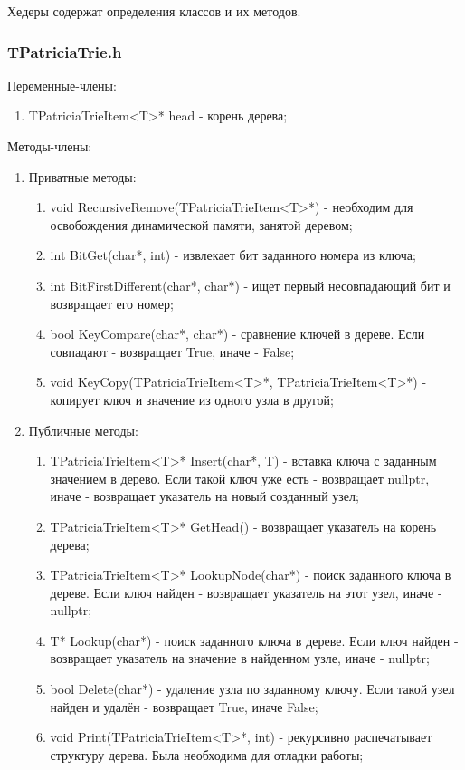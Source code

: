 \documentclass[12pt]{article}
\begin{document}
Хедеры содержат определения классов и их методов.

\subsubsection*{TPatriciaTrie.h}

Переменные-члены:
\begin{enumerate}
	\item TPatriciaTrieItem<T>* head - корень дерева;
\end{enumerate}

Методы-члены:
\begin{enumerate}
	\item Приватные методы:
	\begin{enumerate}
		\item void RecursiveRemove(TPatriciaTrieItem<T>*) - необходим для освобождения динамической памяти, занятой деревом;
		\item int BitGet(char*, int) - извлекает бит заданного номера из ключа;
		\item int BitFirstDifferent(char*, char*) - ищет первый несовпадающий бит и возвращает его номер;
		\item bool KeyCompare(char*, char*) - сравнение ключей в дереве. Если совпадают - возвращает True, иначе - False;
		\item void KeyCopy(TPatriciaTrieItem<T>*, TPatriciaTrieItem<T>*) - копирует ключ и значение из одного узла в другой;
	\end{enumerate}
	\item Публичные методы:
	\begin{enumerate}
		\item TPatriciaTrieItem<T>* Insert(char*, T) - вставка ключа с заданным значением в дерево. Если такой ключ уже есть - возвращает nullptr, иначе - возвращает указатель на новый созданный узел;
		\item TPatriciaTrieItem<T>* GetHead() - возвращает указатель на корень дерева;
		\item TPatriciaTrieItem<T>* LookupNode(char*) - поиск заданного ключа в дереве. Если ключ найден - возвращает указатель на этот узел, иначе - nullptr;
		\item T* Lookup(char*) - поиск заданного ключа в дереве. Если ключ найден - возвращает указатель на значение в найденном узле, иначе - nullptr;
		\item bool Delete(char*) - удаление узла по заданному ключу. Если такой узел найден и удалён - возвращает True, иначе False;
		\item void Print(TPatriciaTrieItem<T>*, int) - рекурсивно распечатывает структуру дерева. Была необходима для отладки работы;

\end{enumerate}
\end{enumerate}
\end{document}
